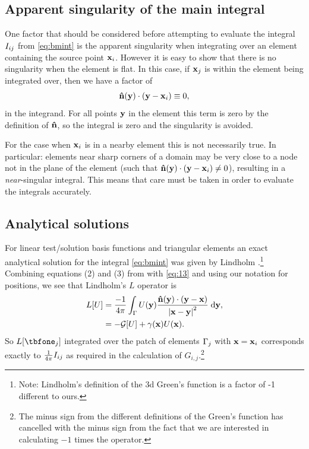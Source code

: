 \subsection{Apparent singularity of the main integral}
\label{sec:bem-singularity}

One factor that should be considered before attempting to evaluate the integral $I_{ij}$ from \cref{eq:bmint} is the apparent singularity when integrating over an element containing the source point $\boldsymbol{\mathrm{x}}_{i}$.
However it is easy to show that there is no singularity when the element is flat.
In this case, if $\boldsymbol{\mathrm{x}}_{j}$ is within the element being integrated over, then we have a factor of
\begin{equation}
  \label{eq:7}
  \boldsymbol{\mathrm{\hat{n}}}(\boldsymbol{\mathrm{y}}) \cdot (\boldsymbol{\mathrm{y}} - \boldsymbol{\mathrm{x}}_i) \equiv 0,
\end{equation}
in the integrand.
For all points $\boldsymbol{\mathrm{y}}$ in the element this term is zero by the definition of $\boldsymbol{\mathrm{\hat{n}}}$, so the integral is zero and the singularity is avoided.

For the case when $\boldsymbol{\mathrm{x}}_i$ is in a nearby element this is not necessarily true.
In particular: elements near sharp corners of a domain may be very close to a node not in the plane of the element (\ie such that $\boldsymbol{\mathrm{\hat{n}}}(\boldsymbol{\mathrm{y}}) \cdot (\boldsymbol{\mathrm{y}} - \boldsymbol{\mathrm{x}}_i) \neq 0$), resulting in a \emph{near}-singular integral.
This means that care must be taken in order to evaluate the integrals accurately.


\subsection{Analytical solutions}

\newcommand{\svu}{\unitv{s}}
\newcommand{\rvu}{\unitv{r}}

For linear test/solution basis functions and triangular elements an exact analytical solution for the integral \cref{eq:bmint} was given by Lindholm \cite[App. B]{Lindholm1984}.\footnote{Note: Lindholm's definition of the 3d Green's function is a factor of -1 different to ours.}
Combining equations (2) and (3) from \cite{Lindholm1984} with \cref{eq:13} and using our notation for positions, we see that Lindholm's $L$ operator is
\begin{equation}
  \begin{aligned}
    L[U] &= \frac{-1}{4 \pi}\int_{\Gamma} U(\boldsymbol{\mathrm{y}}) \frac{\boldsymbol{\mathrm{\hat{n}}}(\boldsymbol{\mathrm{y}}) \cdot (\boldsymbol{\mathrm{y}} -
      \boldsymbol{\mathrm{x}})}{\left|{\boldsymbol{\mathrm{x}} - \boldsymbol{\mathrm{y}}} \right|^2}
    {\; \mathrm{{d}}}\boldsymbol{\mathrm{y}}, \\
    &= -\mathcal{G}[U] + \gamma(\boldsymbol{\mathrm{x}}) U(\boldsymbol{\mathrm{x}}).
  \end{aligned}
\end{equation}
So $L[\tbfone_{\ibasisb}]$ integrated over the patch of elements ${\Gamma}_{j}$ with $\boldsymbol{\mathrm{x}} = \boldsymbol{\mathrm{x}}_{i}$ corresponds exactly to $\frac{1}{4\pi}I_{ij}$ as required in the calculation of $G_{i,j}$.\footnote{The minus sign from the different definitions of the Green's function has cancelled with the minus sign from the fact that we are interested in calculating $-1$ times the operator.}

